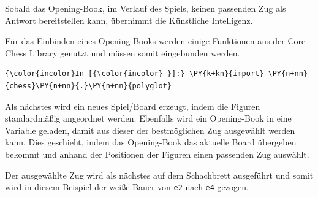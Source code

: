 Sobald das Opening-Book, im Verlauf des Spiels, keinen passenden Zug als
Antwort bereitstellen kann, übernimmt die Künstliche Intelligenz.

Für das Einbinden eines Opening-Books werden einige Funktionen aus der
Core Chess Library genutzt und müssen somit eingebunden werden.

    \begin{Verbatim}[commandchars=\\\{\}]
{\color{incolor}In [{\color{incolor} }]:} \PY{k+kn}{import} \PY{n+nn}{chess}\PY{n+nn}{.}\PY{n+nn}{polyglot}
\end{Verbatim}


    Als nächstes wird ein neues Spiel/Board erzeugt, indem die Figuren
standardmäßig angeordnet werden. Ebenfalls wird ein Opening-Book in eine
Variable geladen, damit aus dieser der bestmöglichen Zug ausgewählt
werden kann. Dies geschieht, indem das Opening-Book das aktuelle Board
übergeben bekommt und anhand der Positionen der Figuren einen passenden
Zug auswählt.

Der ausgewählte Zug wird als nächstes auf dem Schachbrett ausgeführt und
somit wird in diesem Beispiel der weiße Bauer von \texttt{e2} nach
\texttt{e4} gezogen.

